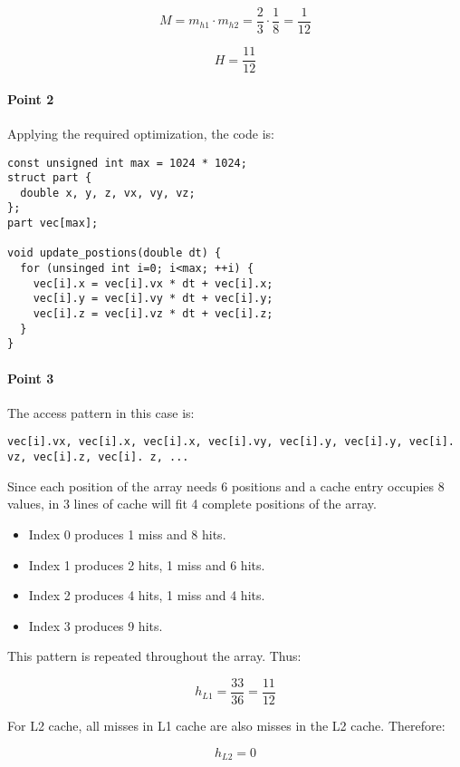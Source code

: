 \[
M = 
m_{h1} \cdot m_{h2} = 
\frac{2}{3} \cdot \frac{1}{8} = 
\frac{1}{12}
\]

\[
H = \frac{11}{12}
\]


\paragraph{Point 2}

Applying the required optimization, the code is:

\begin{lstlisting}
const unsigned int max = 1024 * 1024;
struct part {
  double x, y, z, vx, vy, vz;
};
part vec[max];

void update_postions(double dt) {
  for (unsinged int i=0; i<max; ++i) {
    vec[i].x = vec[i].vx * dt + vec[i].x;
    vec[i].y = vec[i].vy * dt + vec[i].y;
    vec[i].z = vec[i].vz * dt + vec[i].z;
  }
}
\end{lstlisting}

\paragraph{Point 3}

The access pattern in this case is:

\begin{lstlisting}
vec[i].vx, vec[i].x, vec[i].x, vec[i].vy, vec[i].y, vec[i].y, vec[i]. vz, vec[i].z, vec[i]. z, ...
\end{lstlisting}

Since each position of the array needs 6 positions and a cache entry occupies 8 
values, in 3 lines of cache will fit 4 complete positions of the array.

\begin{itemize}
  \item Index 0 produces 1 miss and 8 hits.
  \item Index 1 produces 2 hits, 1 miss and 6 hits.
  \item Index 2 produces 4 hits, 1 miss and 4 hits.
  \item Index 3 produces 9 hits.
\end{itemize}

This pattern is repeated throughout the array. Thus:

\[
h_{L1} = 
\frac{33}{36} = \frac{11}{12}
\]

For L2 cache, all misses in L1 cache are also misses in the L2 cache. Therefore:


\[
h_{L2} = 0
\]

